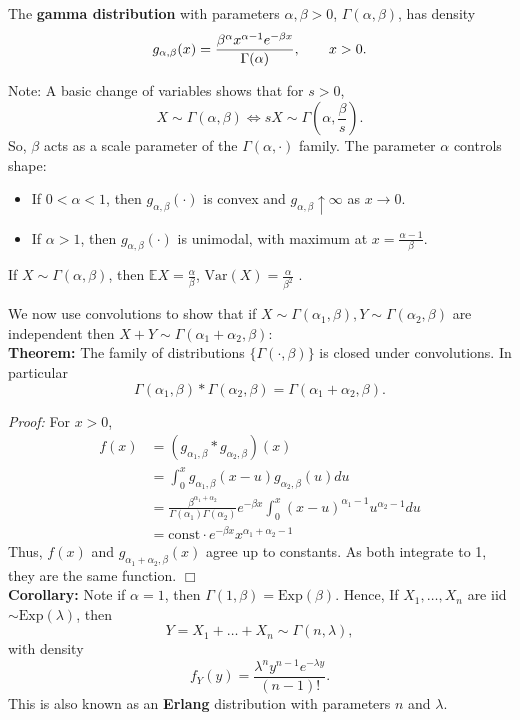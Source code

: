 \documentclass[12pt,oneside]{article}
\begin{document}
\noindent The \textbf{gamma distribution} with parameters $\alpha, \beta > 0$, $\Gamma(\alpha,\beta)$, has density
\[g_{\alpha, \beta} (x) = \frac{\beta^{\alpha} x^{\alpha-1} e^{-\beta x}}{\Gamma (\alpha)}, \hspace{20 pt} x>0.\]

\noindent Note: A basic change of variables shows that for $s>0$, \[X \sim \Gamma(\alpha, \beta) \iff sX \sim \Gamma \left(\alpha, \frac{\beta}{s} \right). \]
So, $\beta$ acts as a scale parameter of the $\Gamma(\alpha, \cdot)$ family.  The parameter $\alpha$ controls shape:
\begin{itemize}
\item If $0 < \alpha < 1$, then $g_{\alpha, \beta} (\cdot)$ is convex and $g_{\alpha,\beta} \uparrow \infty$ as $x \rightarrow 0$.
\item If $\alpha > 1$, then $g_{\alpha, \beta} (\cdot)$ is unimodal, with maximum at $x = \frac{\alpha-1}{\beta}$.
\end{itemize}

\noindent If $X \sim \Gamma(\alpha, \beta)$, then $\mathbb{E}X = \frac{\alpha}{\beta}$, $\mbox{Var}(X) = \frac{\alpha}{\beta^2}$ .

We now use convolutions to show that if $X \sim \Gamma(\alpha_1,\beta), Y\sim \Gamma(\alpha_2,\beta)$ are independent then $X+Y \sim \Gamma(\alpha_1+\alpha_2,\beta)$: \\

\noindent \textbf{Theorem:} The family of distributions $\{\Gamma(\cdot,\beta)\}$ is closed under convolutions.  In particular
\[ \Gamma (\alpha_1,\beta) \ast \Gamma(\alpha_2, \beta) = \Gamma(\alpha_1+\alpha_2,\beta).\]

\noindent \emph{Proof:} For $x>0$,
\begin{align}f(x) &= (g_{\alpha_1,\beta} \ast g_{\alpha_2,\beta}) (x) \nonumber \\
&= \int_0^x g_{\alpha_1,\beta}(x-u) g_{\alpha_2,\beta} (u) du \nonumber \\
&= \frac{\beta^{\alpha_1+\alpha_2}}{\Gamma (\alpha_1) \Gamma (\alpha_2)} e^{-\beta x} \int_0^x (x-u)^{\alpha_1-1} u^{\alpha_2-1} du \label{GamConv}\\
&= \mbox{const} \cdot e^{-\beta x} x^{\alpha_1+\alpha_2 -1} \nonumber
\end{align}
Thus, $f(x)$ and $g_{\alpha_1+\alpha_2, \beta}(x)$ agree up to constants.  As both integrate to 1, they are the same function. $\Box$\\

\noindent \textbf{Corollary:}  Note if $\alpha = 1$, then $\Gamma (1,\beta) = \mbox{Exp} (\beta)$.  Hence, If $X_1,\hdots,X_n$ are iid $\sim \mbox{Exp}(\lambda)$, then \[Y=X_1+\hdots+X_n \sim \Gamma(n,\lambda),\] with density
\[f_Y(y) = \frac{\lambda^n y^{n-1} e^{-\lambda y}}{(n-1)!} .\]
This is also known as an \textbf{Erlang} distribution with parameters $n$ and $\lambda$.\\
\end{document}

